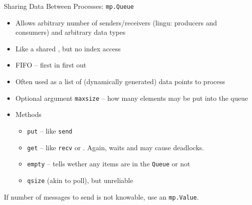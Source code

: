 \begin{frame}{Sharing Data Between Processes: \texttt{mp.Queue}}
%
\begin{itemize}
\item Allows arbitrary number of senders/receivers (lingu: producers and consumers) and arbitrary data types
\item Like a shared , but no index access
\item FIFO – first in first out
\item Often used as a list of (dynamically generated) data points to process
\item Optional argument \texttt{maxsize} -- how many elements may be put into the queue
\item Methods
	\begin{itemize}
	\item \texttt{put} -- like \texttt{send}
	\item \texttt{get} -- like \texttt{recv} or . Again, waits and may cause deadlocks.
	\item \texttt{empty} -- tells wether any items are in the \texttt{Queue} or not
	\item \texttt{qsize} (akin to poll), but unreliable
	\end{itemize}
\end{itemize}
%
\begin{hintbox}
If number of messages to send is not knowable, use an \texttt{mp.Value}.
\end{hintbox}
%
\end{frame}



